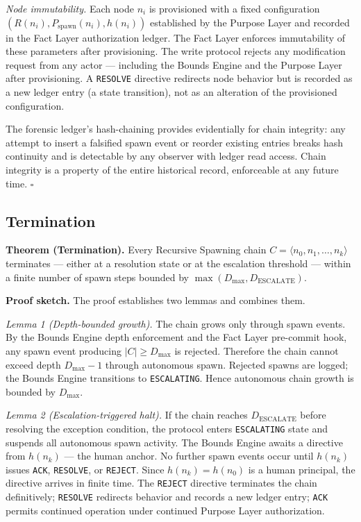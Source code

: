 \medskip
\textit{Node immutability.}
Each node $n_i$ is provisioned with a fixed configuration $(R(n_i), P_{\mathrm{spawn}}(n_i), h(n_i))$ established by the Purpose Layer and recorded in the Fact Layer authorization ledger. The Fact Layer enforces immutability of these parameters after provisioning. The write protocol rejects any modification request from any actor — including the Bounds Engine and the Purpose Layer after provisioning. A \texttt{RESOLVE} directive redirects node behavior but is recorded as a new ledger entry (a state transition), not as an alteration of the provisioned configuration.

The forensic ledger's hash-chaining provides evidentially for chain integrity: any attempt to insert a falsified spawn event or reorder existing entries breaks hash continuity and is detectable by any observer with ledger read access. Chain integrity is a property of the entire historical record, enforceable at any future time. $\square$

\subsection{Termination}
\label{sec:rs-termination}

\medskip
\noindent\textbf{Theorem (Termination).}
Every Recursive Spawning chain $C = \langle n_0, n_1, \ldots, n_k \rangle$ terminates — either at a resolution state or at the escalation threshold — within a finite number of spawn steps bounded by $\max(D_{\mathrm{max}}, D_{\mathrm{ESCALATE}})$.

\medskip
\noindent\textbf{Proof sketch.} The proof establishes two lemmas and combines them.

\medskip
\textit{Lemma 1 (Depth-bounded growth).}
The chain grows only through spawn events. By the Bounds Engine depth enforcement and the Fact Layer pre-commit hook, any spawn event producing $|C| \geq D_{\mathrm{max}}$ is rejected. Therefore the chain cannot exceed depth $D_{\mathrm{max}} - 1$ through autonomous spawn. Rejected spawns are logged; the Bounds Engine transitions to \texttt{ESCALATING}. Hence autonomous chain growth is bounded by $D_{\mathrm{max}}$.

\medskip
\textit{Lemma 2 (Escalation-triggered halt).}
If the chain reaches $D_{\mathrm{ESCALATE}}$ before resolving the exception condition, the protocol enters \texttt{ESCALATING} state and suspends all autonomous spawn activity. The Bounds Engine awaits a directive from $h(n_k)$ — the human anchor. No further spawn events occur until $h(n_k)$ issues \texttt{ACK}, \texttt{RESOLVE}, or \texttt{REJECT}. Since $h(n_k) = h(n_0)$ is a human principal, the directive arrives in finite time. The \texttt{REJECT} directive terminates the chain definitively; \texttt{RESOLVE} redirects behavior and records a new ledger entry; \texttt{ACK} permits continued operation under continued Purpose Layer authorization.

